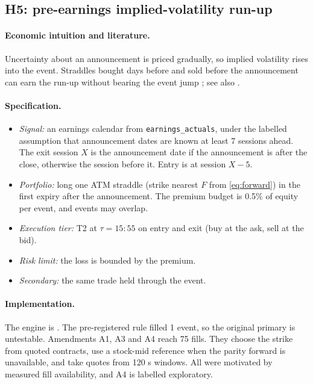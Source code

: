 \documentclass[../main.tex]{subfiles}
\begin{document}
\subsection{H5: pre-earnings implied-volatility run-up}\label{sec:h5}

\paragraph{Economic intuition and literature.}
Uncertainty about an announcement is priced gradually, so implied volatility rises into the event. Straddles bought days before and sold before the announcement can earn the run-up without bearing the event jump \citep{gaoxing2018}; see also \citet{dubinsky2019}.

\paragraph{Specification.}
\begin{itemize}
\item \emph{Signal:} an earnings calendar from \texttt{earnings\_actuals}, under the labelled assumption that announcement dates are known at least 7 sessions ahead. The exit session $X$ is the announcement date if the announcement is after the close, otherwise the session before it. Entry is at session $X-5$.
\item \emph{Portfolio:} long one ATM straddle (strike nearest $F$ from \eqref{eq:forward}) in the first expiry after the announcement. The premium budget is 0.5\% of equity per event, and events may overlap.
\item \emph{Execution tier:} T2 at $\tau = 15{:}55$ on entry and exit (buy at the ask, sell at the bid).
\item \emph{Risk limit:} the loss is bounded by the premium.
\item \emph{Secondary:} the same trade held through the event.
\end{itemize}

\paragraph{Implementation.}
The engine is . The pre-registered rule filled 1 event, so the original primary is untestable. Amendments A1, A3 and A4 reach 75 fills. They choose the strike from quoted contracts, use a stock-mid reference when the parity forward is unavailable, and take quotes from 120 s windows. All were motivated by measured fill availability, and A4 is labelled exploratory.
\end{document}
